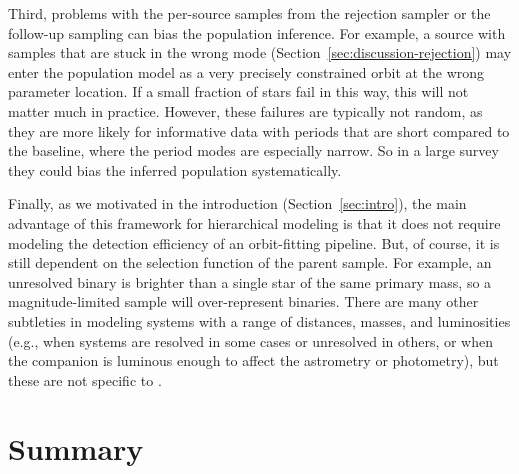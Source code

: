 \documentclass[twocolumn]{AASTeX7/aastex701}
\newcommand{\harv}{\package{harv}}
\begin{document}
Third, problems with the per-source samples from the rejection sampler or the
follow-up sampling can bias the population inference.
For example, a source with samples that are stuck in the wrong mode
(Section~\ref{sec:discussion-rejection}) may enter the population model as a very
precisely constrained orbit at the wrong parameter location.
If a small fraction of stars fail in this way, this will not matter much in practice.
However, these failures are typically not random, as they are more likely for
informative data with periods that are short compared to the baseline, where the period
modes are especially narrow.
So in a large survey they could bias the inferred population systematically.

Finally, as we motivated in the introduction (Section~\ref{sec:intro}), the main
advantage of this framework for hierarchical modeling is that it does not require
modeling the detection efficiency of an orbit-fitting pipeline.
But, of course, it is still dependent on the selection function of the parent sample.
For example, an unresolved binary is brighter than a single star of the same primary
mass, so a magnitude-limited sample will over-represent binaries.
There are many other subtleties in modeling systems with a range of distances, masses,
and luminosities (e.g., when systems are resolved in some cases or unresolved in others,
or when the companion is luminous enough to affect the astrometry or photometry), but
these are not specific to \harv.


\section{Summary}
\label{sec:summary}
\end{document}
